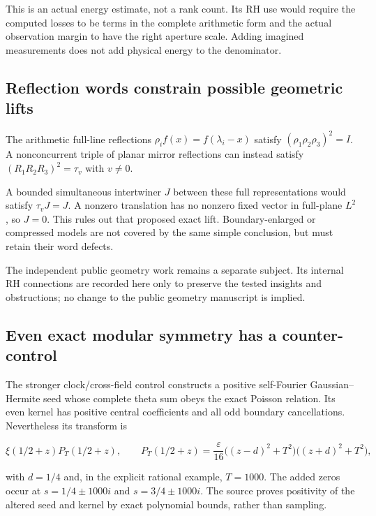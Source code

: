 \documentclass[
  10pt,
  a4paper,
  10pt,
  oneside,
  openany]{book}
\begin{document}
This is an actual energy estimate, not a rank count. Its RH use would
require the computed losses to be terms in the complete arithmetic form
and the actual observation margin to have the right aperture scale.
Adding imagined measurements does not add physical energy to the
denominator.

\subsection{Reflection words constrain possible geometric
lifts}\label{reflection-words-constrain-possible-geometric-lifts}

The arithmetic full-line reflections \(\rho_i f(x)=f(\lambda_i-x)\)
satisfy \((\rho_1\rho_2\rho_3)^2=I\). A nonconcurrent triple of planar
mirror reflections can instead satisfy \((R_1R_2R_3)^2=\tau_v\) with
\(v\ne0\).

A bounded simultaneous intertwiner \(J\) between these full
representations would satisfy \(\tau_vJ=J\). A nonzero translation has
no nonzero fixed vector in full-plane \(L^2\), so \(J=0\). This rules
out that proposed exact lift. Boundary-enlarged or compressed models are
not covered by the same simple conclusion, but must retain their word
defects.

The independent public geometry work remains a separate subject. Its
internal RH connections are recorded here only to preserve the tested
insights and obstructions; no change to the public geometry manuscript
is implied.

\subsection{Even exact modular symmetry has a
counter-control}\label{even-exact-modular-symmetry-has-a-counter-control}

The stronger clock/cross-field control constructs a positive
self-Fourier Gaussian--Hermite seed whose complete theta sum obeys the
exact Poisson relation. Its even kernel has positive central
coefficients and all odd boundary cancellations. Nevertheless its
transform is

\[
 \xi(1/2+z)P_T(1/2+z),
 \qquad
 P_T(1/2+z)=\frac\varepsilon{16}
 \bigl((z-d)^2+T^2\bigr)\bigl((z+d)^2+T^2\bigr),
 \tag{45.2}\label{eq:45.2}
\]

with \(d=1/4\) and, in the explicit rational example, \(T=1000\). The
added zeros occur at \(s=1/4\pm1000i\) and \(s=3/4\pm1000i\). The source
proves positivity of the altered seed and kernel by exact polynomial
bounds, rather than sampling.
\end{document}
